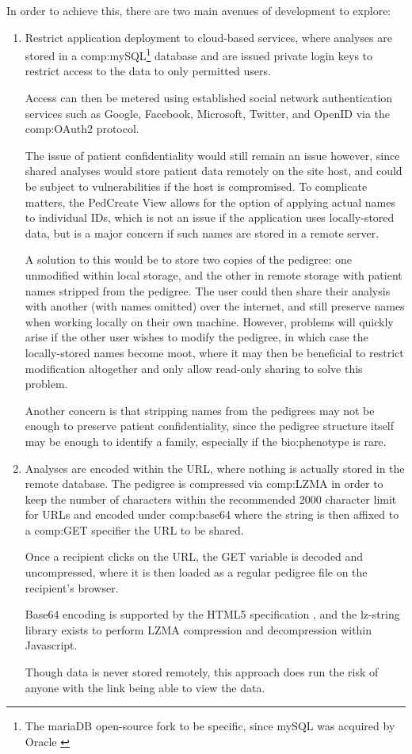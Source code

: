 In order to achieve this, there are two main avenues of development to explore:
\begin{enumerate}
\item{Restrict application deployment to cloud-based services, where analyses are stored in a \gls{comp:mySQL}\footnote{The mariaDB open-source fork to be specific, since mySQL was acquired by Oracle \cite{oraclemysql}} database and are issued private login keys to restrict access to the data to only permitted users.

Access can then be metered using established social network authentication services such as Google, Facebook, Microsoft, Twitter, and OpenID via the \gls{comp:OAuth2} \cite{hardt2012oauth} protocol.

The issue of patient confidentiality would still remain an issue however, since shared analyses would store patient data remotely on the site host, and could be subject to vulnerabilities if the host is compromised.  To complicate matters, the PedCreate View allows for the option of applying actual names to individual IDs, which is not an issue if the application uses locally-stored data, but is a major concern if such names are stored in a remote server.

A solution to this would be to store two copies of the pedigree: one unmodified within local storage, and the other in remote storage with patient names stripped from the pedigree. The user could then share their analysis with another (with names omitted) over the internet, and still preserve names when working locally on their own machine. However, problems will quickly arise if the other user wishes to modify the pedigree, in which case the locally-stored names become moot, where it may then be beneficial to restrict modification altogether and only allow read-only sharing to solve this problem.

Another concern is that stripping names from the pedigrees may not be enough to preserve patient confidentiality, since the pedigree structure itself may be enough to identify a family, especially if the \gls{bio:phenotype} is rare.
}
\item{Analyses are encoded within the URL, where nothing is actually stored in the remote database. The pedigree is compressed via \gls{comp:LZMA} \cite{lzma} in order to keep the number of characters within the recommended 2000 character limit for URLs \cite{urllength} and encoded under \gls{comp:base64} where the string is then affixed to a \gls{comp:GET} specifier the URL to be shared.

Once a recipient clicks on the URL, the GET variable is decoded and uncompressed, where it is then loaded as a regular pedigree file on the recipient's browser. 

Base64 encoding is supported by the HTML5 specification \cite{masinter1998data}, and the lz-string library exists \cite{lzstring} to perform LZMA compression and decompression within Javascript.

Though data is never stored remotely, this approach does run the risk of anyone with the link being able to view the data.
}
\end{enumerate}

